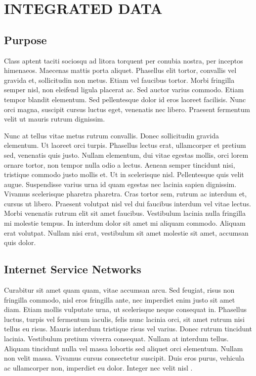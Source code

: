 \chapter{INTEGRATED DATA}\label{CH2}

\section{Purpose}

Class aptent taciti sociosqu ad litora torquent per conubia nostra, per inceptos himenaeos. Maecenas mattis porta
aliquet. Phasellus elit tortor, convallis vel gravida et, sollicitudin non metus. Etiam vel faucibus tortor. Morbi
fringilla semper nisl, non eleifend ligula placerat ac. Sed auctor varius commodo. Etiam tempor blandit elementum. Sed
pellentesque dolor id eros laoreet facilisis. Nunc orci magna, suscipit cursus luctus eget, venenatis nec libero.
Praesent fermentum velit ut mauris rutrum dignissim.

Nunc at tellus vitae metus rutrum convallis. Donec sollicitudin gravida elementum. Ut laoreet orci turpis. Phasellus
lectus erat, ullamcorper et pretium sed, venenatis quis justo. Nullam elementum, dui vitae egestas mollis, orci lorem
ornare tortor, non tempor nulla odio a lectus. Aenean semper tincidunt nisi, tristique commodo justo mollis et. Ut in
scelerisque nisl. Pellentesque quis velit augue. Suspendisse varius urna id quam egestas nec lacinia sapien dignissim.
Vivamus scelerisque pharetra pharetra. Cras tortor sem, rutrum ac interdum et, cursus ut libero. Praesent volutpat nisl
vel dui faucibus interdum vel vitae lectus. Morbi venenatis rutrum elit sit amet faucibus. Vestibulum lacinia nulla
fringilla mi molestie tempus. In interdum dolor sit amet mi aliquam commodo. Aliquam erat volutpat. Nullam nisi erat,
vestibulum sit amet molestie sit amet, accumsan quis dolor. 

\section{Internet Service Networks}

Curabitur sit amet quam quam, vitae accumsan arcu. Sed feugiat, risus non fringilla commodo, nisl eros fringilla ante,
nec imperdiet enim justo sit amet diam. Etiam mollis vulputate urna, ut scelerisque neque consequat in. Phasellus
luctus, turpis vel fermentum iaculis, felis nunc lacinia orci, sit amet rutrum nisi tellus eu risus. Mauris interdum
tristique risus vel varius. Donec rutrum tincidunt lacinia. Vestibulum pretium viverra consequat. Nullam at interdum
tellus. Aliquam tincidunt nulla vel massa lobortis sed aliquet orci elementum. Nullam non velit massa. Vivamus cursus
consectetur suscipit. Duis eros purus, vehicula ac ullamcorper non, imperdiet eu dolor. Integer nec velit nisl
\cite{moore91}. 

